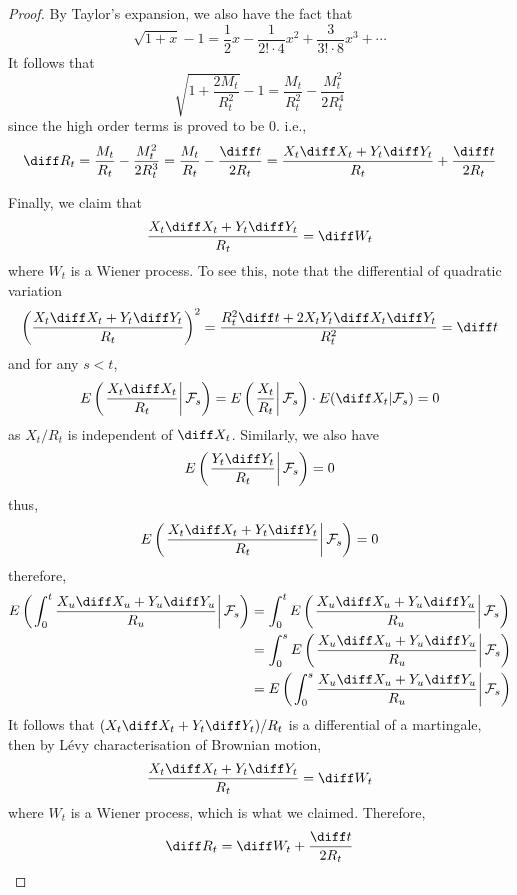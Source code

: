 \begin{proof}
        By Taylor's expansion, we also have the fact that
        \[\sqrt{1+x}-1=\frac{1}{2}x-\frac{1}{2!\cdot 4}x^2+\frac{3}{3!\cdot 8}x^3
        +\cdots\]
        It follows that
        \[\sqrt{1+\frac{2M_t}{R_t^2}}-1
        =\frac{M_t}{R_t^2}-\frac{M_t^2}{2R_t^4}\]
        since the high order terms is proved to be 0.
        i.e.,
        \[\diff R_t=\frac{M_t}{R_t}-\frac{M_t^2}{2R_t^3}
        =\frac{M_t}{R_t}-\frac{\diff t}{2R_t}
        =\frac{X_t\diff X_t+Y_t\diff Y_t}{R_t}+\frac{\diff t}{2R_t}\]

        Finally, we claim that
        \[\frac{X_t\diff X_t+Y_t\diff Y_t}{R_t}=\diff W_t\]
        where $W_t$ is a Wiener process. To see this, note that
        the differential of quadratic variation
        \[\left(\frac{X_t\diff X_t+Y_t\diff Y_t}{R_t}\right)^2
        =\frac{R_t^2\diff t+2X_tY_t\diff X_t\diff Y_t}{R_t^2}=\diff t\]
        and for any $s<t$,
        \[E\left(\left.\frac{X_t\diff X_t}{R_t}\right|\mathcal F_s\right)
        =E\left(\left.\frac{X_t}{R_t}\right|\mathcal F_s\right)
        \cdot E(\diff X_t|\mathcal F_s)=0\]
        as $X_t/R_t$ is independent of $\diff X_t$.
        Similarly, we also have
        \[E\left(\left.\frac{Y_t\diff Y_t}{R_t}\right|\mathcal F_s\right)=0\]
        thus,
        \[E\left(\left.\frac{X_t\diff X_t+Y_t\diff Y_t}{R_t}\right|\mathcal F_s\right)=0\]
        therefore,
        \[\begin{aligned}
            E\left(\left.\int_0^t\frac{X_u\diff X_u+Y_u\diff Y_u}{R_u}\right|\mathcal F_s\right)
            &=\int_0^tE\left(\left.\frac{X_u\diff X_u+Y_u\diff Y_u}{R_u}\right|\mathcal F_s\right)\\
            &=\int_0^sE\left(\left.\frac{X_u\diff X_u+Y_u\diff Y_u}{R_u}\right|\mathcal F_s\right)\\
            &=E\left(\left.\int_0^s\frac{X_u\diff X_u+Y_u\diff Y_u}{R_u}\right|\mathcal F_s\right)\\
        \end{aligned}\]
        It follows that $(X_t\diff X_t+Y_t\diff Y_t)/R_t$ is a differential of a
        martingale, then by L\'evy characterisation of Brownian motion,
        \[\frac{X_t\diff X_t+Y_t\diff Y_t}{R_t}=\diff W_t\]
        where $W_t$ is a Wiener process, which is what we claimed.
        Therefore,
        \[\diff R_t=\diff W_t+\frac{\diff t}{2R_t}\]
    \end{proof}

    \appendix

